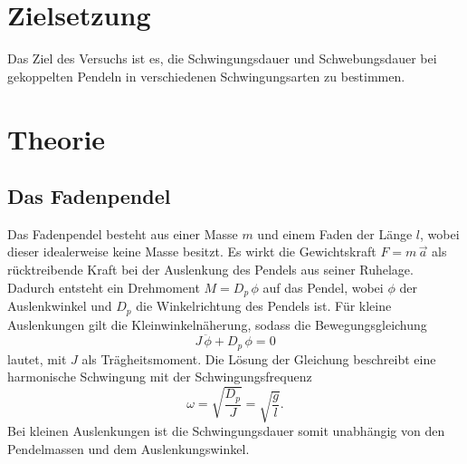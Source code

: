 \section{Zielsetzung}
\label{sec:Zielsetzung}
Das Ziel des Versuchs ist es, die Schwingungsdauer und Schwebungsdauer bei gekoppelten Pendeln in verschiedenen Schwingungsarten zu bestimmen.

\section{Theorie}
\label{sec:Theorie}

\subsection{Das Fadenpendel} %
\label{sub:Fadenpendel}
Das Fadenpendel besteht aus einer Masse $m$ und einem Faden der Länge $l$, wobei dieser idealerweise keine Masse besitzt.
Es wirkt die Gewichtskraft $F=m\,\vec{a}$ als rücktreibende Kraft bei der Auslenkung des Pendels aus seiner Ruhelage.
Dadurch entsteht ein Drehmoment $M=D_p\, \phi$ auf das Pendel, wobei $\phi$ der Auslenkwinkel und $D_p$ die Winkelrichtung des Pendels ist.
Für kleine Auslenkungen gilt die Kleinwinkelnäherung, sodass die Bewegungsgleichung
\begin{equation*}
    J \, \ddot{\phi} + D_p \, \phi = 0
\end{equation*}
lautet, mit $J$ als Trägheitsmoment.
Die Lösung der Gleichung beschreibt eine harmonische Schwingung mit der Schwingungsfrequenz
\begin{equation*}
    \omega = \sqrt{\frac{D_p}{J}} = \sqrt{\frac{g}{l}}.
\end{equation*}
Bei kleinen Auslenkungen ist die Schwingungsdauer somit unabhängig von den Pendelmassen und dem Auslenkungswinkel.
 

